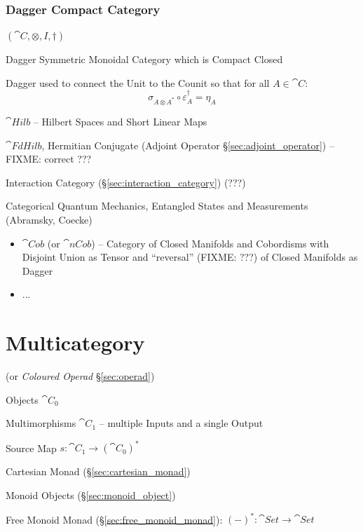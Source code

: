 \subsubsection{Dagger Compact Category}\label{sec:dagger_compact}

$(\cat{C}, \otimes, I, \dag)$

Dagger Symmetric Monoidal Category which is Compact Closed

Dagger used to connect the Unit to the Counit so that for all $A \in \cat{C}$:
\[
  \sigma_{A \otimes A^*} \circ \varepsilon_A^\dag = \eta_A
\]

$\cat{Hilb}$ -- Hilbert Spaces and Short Linear Maps

$\cat{FdHilb}$, Hermitian Conjugate (Adjoint Operator
\S\ref{sec:adjoint_operator}) --FIXME: correct ???

Interaction Category (\S\ref{sec:interaction_category}) (???)

Categorical Quantum Mechanics, Entangled States and Measurements (Abramsky,
Coecke)

\begin{itemize}
  \item $\cat{Cob}$ (or $\cat{nCob}$) -- Category of Closed Manifolds and
    Cobordisms with Disjoint Union as Tensor and ``reversal'' (FIXME: ???) of
    Closed Manifolds as Dagger
  \item ...
\end{itemize}



\section{Multicategory}\label{sec:multicategory}

(or \emph{Coloured Operad} \S\ref{sec:operad})

Objects $\cat{C}_0$

Multimorphisms $\cat{C}_1$ -- multiple Inputs and a single Output

Source Map $s : \cat{C}_1 \rightarrow (\cat{C}_0)^*$

Cartesian Monad (\S\ref{sec:cartesian_monad})

Monoid Objects (\S\ref{sec:monoid_object})

Free Monoid Monad (\S\ref{sec:free_monoid_monad}): $(-)^* : \cat{Set}
\rightarrow \cat{Set}$


